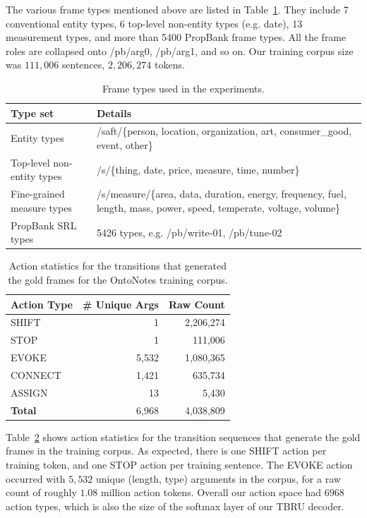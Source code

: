 \documentclass[11pt,a4paper]{article}
\begin{document}
The various frame types mentioned above are listed in
Table~\ref{tab:types}. They include 7 conventional entity types,
6 top-level non-entity types (e.g. date), 13 measurement types, and
more than 5400 PropBank frame types. All the frame roles are collapsed onto
/pb/arg0, /pb/arg1, and so on. Our training corpus size was $111,006$
sentences, $2,206,274$ tokens.

\begin{table}[t]
\begin{tabular}{|l|p{11cm}|}
\hline
{\bf Type set} & {\bf Details} \\
\hline
Entity types & /saft/\{person, location, organization, art, consumer\_good, event, other\} \\
\hline
Top-level non-entity types & /s/\{thing, date, price, measure, time, number\} \\
\hline
Fine-grained measure types & /s/measure/\{area, data, duration, energy, frequency, fuel, length, mass, power, speed, temperate, voltage, volume\} \\
\hline
PropBank SRL types & 5426 types, e.g. /pb/write-01, /pb/tune-02  \\
\hline
\end{tabular}
\caption{Frame types used in the experiments.}
\label{tab:types}
\end{table}

\begin{table}[t]
\begin{tabular}{|l|r|r|}
\hline
{\bf Action Type} & {\bf \# Unique Args} & {\bf Raw Count} \\
\hline
SHIFT & 1 & 2,206,274 \\
\hline
STOP & 1 & 111,006 \\
\hline
EVOKE & 5,532 & 1,080,365 \\
\hline
CONNECT & 1,421 & 635,734 \\
\hline
ASSIGN & 13 & 5,430 \\
\hline
{\bf Total} & 6,968 & 4,038,809 \\
\hline
\end{tabular}
\caption{Action statistics for the transitions that generated
the gold frames for the OntoNotes training corpus.}
\label{tab:action-table}
\end{table}

Table~\ref{tab:action-table} shows action statistics for the transition sequences that
generate the gold frames in the training corpus. As expected, there is one
SHIFT action per training token, and one STOP action per training sentence.
The EVOKE action occurred with $5,532$ unique (length, type) arguments in the
corpus, for a raw count of roughly $1.08$ million action tokens. Overall our action space
had $6968$ action types, which is also the size of the softmax layer of our TBRU
decoder.
\end{document}
